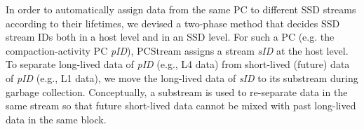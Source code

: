 In order to automatically assign data from the same PC to different SSD streams
according to their lifetimes, we devised a two-phase method that decides SSD
stream IDs both in a host level and in an SSD level.
For such a PC (e.g. the compaction-activity PC {\it pID}), \textsf{\small PCStream} assigns a
stream {\it sID} at the host level.
To separate long-lived data of 
{\it pID} (e.g., L4 data) from short-lived (future) data of {\it pID} (e.g., L1 data), 
we move the long-lived data of {\it sID} to its substream during garbage collection.   
Conceptually, a substream is used to re-separate data in the same stream so that 
future short-lived data cannot be mixed with past long-lived data in the same block.

